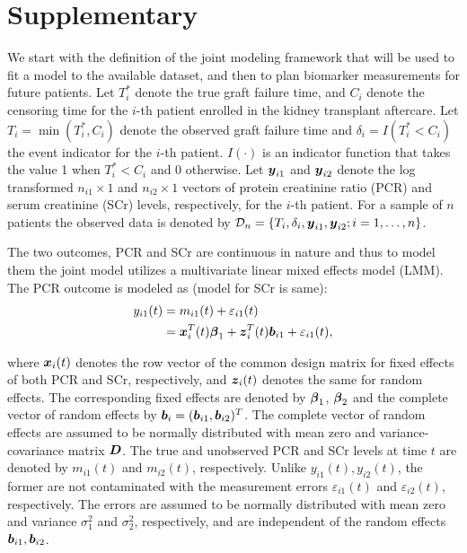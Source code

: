 
\section{Supplementary}
\label{suppl : jm_framework}
We start with the definition of the joint modeling framework that will be used to fit a model to the available dataset, and then to plan biomarker measurements for future patients. Let $T_i^*$ denote the true graft failure time, and $C_i$ denote the censoring time for the $i$-th patient enrolled in the kidney transplant aftercare. Let $T_i = \min(T^*_i, C_i)$ denote the observed graft failure time and $\delta_i = I(T^*_i < C_i)$ the event indicator for the $i$-th patient. $I(\cdot)$ is an indicator function that takes the value 1 when $T^*_i < C_i$ and 0 otherwise. Let $\boldsymbol{y}_{i1}$ and $\boldsymbol{y}_{i2}$ denote the log transformed $n_{i1} \times 1$ and $n_{i2} \times 1$ vectors of protein creatinine ratio (PCR) and serum creatinine (SCr) levels, respectively, for the $i$-th patient. For a sample of $n$ patients the observed data is denoted by $\mathcal{D}_n = \{T_i, \delta_i, \boldsymbol{y}_{i1}, \boldsymbol{y}_{i2}; i = 1, \ldots, n\}$.

The two outcomes, PCR and SCr are continuous in nature and thus to model them the joint model utilizes a multivariate linear mixed effects model (LMM). The PCR outcome is modeled as (model for SCr is same):
\begin{equation*}
\begin{split}
y_{i1}(t) &= m_{i1}(t) + \varepsilon_{i1}(t)\\
&=\boldsymbol{x}_{i}^T(t) \boldsymbol{\beta}_1 + \boldsymbol{z}_{i}^T(t) \boldsymbol{b}_{i1} + \varepsilon_{i1}(t),
\end{split}
\end{equation*}

where $\boldsymbol{x}_{i}(t)$ denotes the row vector of the common design matrix for fixed effects of both PCR and SCr, respectively, and $\boldsymbol{z}_{i}(t)$ denotes the same for random effects. The corresponding fixed effects are denoted by $\boldsymbol{\beta}_1$, $\boldsymbol{\beta}_2$ and the complete vector of random effects by $\boldsymbol{b}_i = (\boldsymbol{b}_{i1}, \boldsymbol{b}_{i2})^T$. The complete vector of random effects are assumed to be normally distributed with mean zero and variance-covariance matrix $\boldsymbol{D}$. The true and unobserved PCR and SCr levels at time $t$ are denoted by $m_{i1}(t)$ and $m_{i2}(t)$, respectively. Unlike $y_{i1}(t), y_{i2}(t)$, the former are not contaminated with the measurement errors $\varepsilon_{i1}(t)$ and $\varepsilon_{i2}(t)$, respectively. The errors are assumed to be normally distributed with mean zero and variance $\sigma_1^2$ and $\sigma_2^2$, respectively, and are independent of the random effects $\boldsymbol{b}_{i1}, \boldsymbol{b}_{i2}$.


